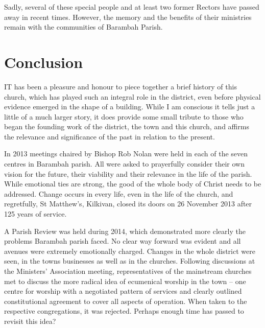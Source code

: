 Sadly, several of these special people and at least two former Rectors have passed away in recent times. However, the memory and the benefits of their ministries remain with the communities of Barambah Parish.



\balance


\printendnotes[custom]
\setcounter{endnote}{0}
\chapter{Conclusion}
\nobalance


\lettrine[lines=3]{I}{T}
 has been a pleasure and honour to piece together a brief history of this church, which has played such an integral role in the district, even before physical evidence emerged in the shape of a building. While I am conscious it tells just a little of a much larger story, it does provide some small tribute to those who began the founding work of the district, the town and this church, and affirms the relevance and significance of the past in relation to the present.

In 2013 meetings chaired by Bishop Rob Nolan were held in each of the seven centres in Barambah parish. All were asked to prayerfully consider their own vision for the future, their viability and their relevance in the life of the parish. While emotional ties are strong, the good of the whole body of Christ needs to be addressed. Change occurs in every life, even in the life of the church, and regretfully, St Matthew's, Kilkivan, closed its doors on 26 November 2013 after 125 years of service.



A Parish Review was held during 2014, which demonstrated more clearly the problems Barambah parish faced. No clear way forward was evident and all avenues were extremely emotionally charged. Changes in the whole district were seen, in the towns businesses as well as in the churches. Following discussions at the Ministers' Association meeting, representatives of the mainstream churches met to discuss the more radical idea of ecumenical worship in the town -- one centre for worship with a negotiated pattern of services and clearly outlined constitutional agreement to cover all aspects of operation. When taken to the respective congregations, it was rejected. Perhaps enough time has passed to revisit this idea?



